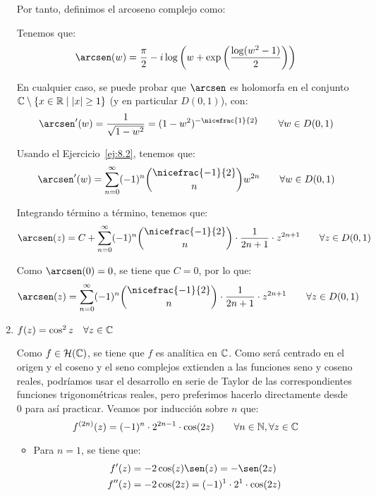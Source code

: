 \begin{ejercicio}
\begin{enumerate}
        Por tanto, definimos el arcoseno complejo como:

        Tenemos que:
        \begin{equation*}
            \arcsen(w)=\dfrac{\pi}{2}-i\log\left(w+\exp\left(\dfrac{\log(w^2-1)}{2}\right)\right)
        \end{equation*}

        En cualquier caso, se puede probar que $\arcsen$ es holomorfa en el conjunto $\mathbb{C}\setminus \{x\in \mathbb{R}\mid |x|\geq 1\}$ (y en particular $D(0,1)$), con:
        \begin{equation*}
            \arcsen'(w)=\dfrac{1}{\sqrt{1-w^2}}=(1-w^2)^{-\nicefrac{1}{2}}
            \qquad \forall w\in D(0,1) 
        \end{equation*}

        Usando el Ejercicio~\ref{ej:8.2}, tenemos que:
        \begin{equation*}
            \arcsen'(w)=\sum_{n=0}^{\infty} (-1)^n\binom{\nicefrac{-1}{2}}{n}{w}^{2n}\qquad \forall w\in D(0,1)
        \end{equation*}

        Integrando término a término, tenemos que:
        \begin{equation*}
            \arcsen(z)=C+\sum_{n=0}^{\infty} (-1)^n\binom{\nicefrac{-1}{2}}{n}\cdot \dfrac{1}{2n+1}\cdot {z}^{2n+1}\qquad \forall z\in D(0,1)
        \end{equation*}

        Como $\arcsen(0)=0$, se tiene que $C=0$, por lo que:
        \begin{equation*}
            \arcsen(z)=\sum_{n=0}^{\infty} (-1)^n\binom{\nicefrac{-1}{2}}{n}\cdot \dfrac{1}{2n+1}\cdot {z}^{2n+1}\qquad \forall z\in D(0,1)
        \end{equation*}

        
        \item $f(z) = \cos^2 z \quad \forall z \in \mathbb{C}$
        
        Como $f\in \mathcal{H}(\mathbb{C})$, se tiene que $f$ es analítica en $\mathbb{C}$. Como será centrado en el origen y el coseno y el seno complejos extienden a las funciones seno y coseno reales, podríamos usar el desarrollo en serie de Taylor de las correspondientes funciones trigonométricas reales, pero preferimos hacerlo directamente desde $0$ para así practicar.        
        Veamos por inducción sobre $n$ que:
        \begin{equation*}
            f^{(2n)}(z) = (-1)^{n}\cdot 2^{2n-1}\cdot \cos(2z) \qquad \forall n \in \mathbb{N}, \forall z \in \mathbb{C}
        \end{equation*}
        \begin{itemize}
            \item Para $n=1$, se tiene que:
            \begin{align*}
                f'(z) &= -2\cos(z)\sen(z) = -\sen(2z)\\
                f''(z) &= -2\cos(2z) = (-1)^1\cdot 2^{1}\cdot \cos(2z)
            \end{align*}


\end{itemize}
\end{enumerate}
\end{ejercicio}
